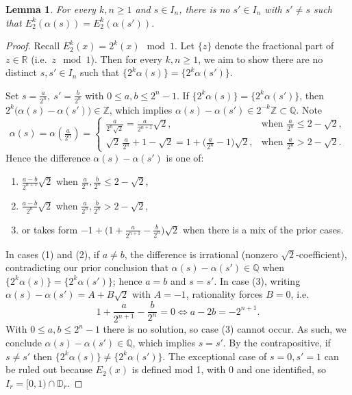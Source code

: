 \documentclass{amsart}
\theoremstyle{theorem}
\newtheorem{lemma}[theorem]{Lemma}
\theoremstyle{remark}
\newcommand{\DD}{\mathbb{D}}
\newcommand{\QQ}{\mathbb{Q}}
\newcommand{\RR}{\mathbb{R}}
\newcommand{\ZZ}{\mathbb{Z}}
\begin{document}
\begin{lemma}\label{lem:smallPreimage}
For every $k, n \geq 1$ and $s \in I_{n}$, there is no $s' \in I_n$ with $s'\neq s$ such that $E_2^k(\alpha(s))=E_2^k(\alpha(s'))$.
\end{lemma}
\begin{proof}
Recall $E_2^k(x) = 2^k(x) \mod 1$.
Let $\{z\}$ denote the fractional part of $z \in \RR$ (i.e.\ $z \mod 1$). Then for every $k, n \geq 1$, we aim to show there are no distinct $s, s' \in I_n$ such that $\{2^k\alpha(s)\} = \{2^k\alpha(s')\}$.

Set $s=\frac{a}{2^{n}},\ s'=\frac{b}{2^{n}}$ with $0\le a,b\le 2^{n}-1$.
If $\{2^{k}\alpha(s)\}=\{2^{k}\alpha(s')\}$, then $2^{k}\big(\alpha(s)-\alpha(s')\big)\in\ZZ$, which implies $\alpha(s)-\alpha(s')\in 2^{-k}\ZZ \subset\QQ$.
Note
\[
\alpha(s) = \alpha\left(\tfrac{a}{2^{n}}\right)=
\begin{cases}
\frac{a}{2^{n}\sqrt2}=\frac{a}{2^{n+1}}\sqrt2, & \text{when }\frac{a}{2^{n}}\le 2-\sqrt2,\\
\sqrt2\,\frac{a}{2^{n}}+1-\sqrt2
=1+\Big(\frac{a}{2^{n}}-1\Big)\sqrt2, & \text{when }\tfrac{a}{2^{n}}> 2-\sqrt2.
\end{cases}
\]
Hence the difference $\alpha(s)-\alpha(s')$ is one of: 
\begin{enumerate}
\item $\frac{a-b}{2^{n+1}}\sqrt{2}$ when $\frac{a}{2^{n}},\frac{b}{2^{n}}\le 2-\sqrt2$, 
\item $\frac{a-b}{2^{n}}\sqrt2$ when $\frac{a}{2^{n}},\frac{b}{2^{n}}> 2-\sqrt2$,
\item or takes form $-1+\Big(1+\frac{a}{2^{n+1}}-\frac{b}{2^{n}}\Big)\sqrt2$ when there is a mix of the prior cases.
\end{enumerate}
In cases (1) and (2), if $a\ne b$, the difference is irrational (nonzero $\sqrt2$-coefficient), contradicting our prior conclusion that $\alpha(s)-\alpha(s')\in \QQ$ when $\{2^{k}\alpha(s)\}=\{2^{k}\alpha(s')\}$; hence $a=b$ and $s=s'$.
In case (3), writing $\alpha(s)-\alpha(s')=A+B\sqrt2$ with $A=-1$, rationality forces $B=0$, i.e.
\[
1+\frac{a}{2^{n+1}}-\frac{b}{2^{n}}=0 \iff a-2b=-2^{n+1}.
\]
With $0\le a,b\le 2^{n}-1$ there is no solution, so case (3) cannot occur.
As such, we conclude $\alpha(s)-\alpha(s')\in\mathbb Q$, which implies $s=s'$. By the contrapositive, if $s\ne s'$ then $\{2^{k}\alpha(s)\}\ne \{2^{k}\alpha(s')\}$.
The exceptional case of $s=0,s'=1$ can be ruled out because $E_2(x)$ is defined mod 1, with $0$ and one identified, so $I_r = [0,1)\cap \DD_r$.
\end{proof}
\end{document}
